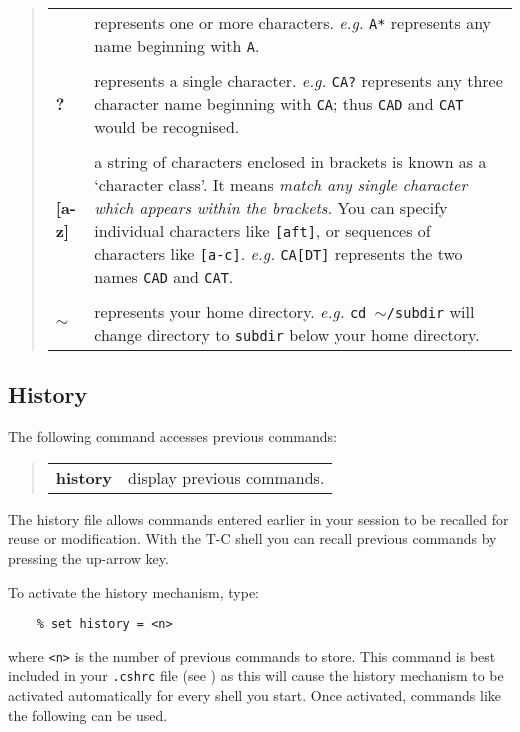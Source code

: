 \begin{quote}
\begin{tabular}{lp{77mm}}

{\bf  *}  & represents one or more characters. {\em e.g.}\/ {\tt A*}
  represents any name beginning with {\tt A}.\\
\\
{\bf  ?}  & represents a single character.  {\em e.g.}\/ {\tt CA?}
  represents any three character name beginning with {\tt CA}; thus {\tt CAD}
  and {\tt CAT} would be recognised.\\
\\
{\bf  [a-z]}   & a string of characters enclosed in brackets is known as a
  `character class'.  It means {\em match any single character which appears
  within the brackets.}  You can specify individual characters like
  {\tt [aft]}, or sequences of   characters like {\tt [a-c]}.  {\em e.g.}\/
  {\tt CA[DT]} represents the two names {\tt CAD} and {\tt CAT}.\\
\\
{\bf $\sim$}   & represents your home directory.  {\em e.g.}\/ {\tt cd
  {\bf $\sim$}/subdir} will change directory to {\tt subdir} below your home
  directory.

\end{tabular}
\end{quote}


\subsection{History}

The following command accesses previous commands:
\begin{quote}
\begin{tabular}{lp{67mm}}

{\bf history}  & display previous commands.

\end{tabular}
\end{quote}
The history file allows commands entered earlier in your session to be recalled
for reuse or modification.
With the T-C shell you can recall previous commands by pressing the
up-arrow key.

To activate the history mechanism, type:
\begin{verbatim}
    % set history = <n>
\end{verbatim}
where {\tt <n>} is the number of previous commands to store.
This command is best included in your {\tt .cshrc} file
(see )
as this will cause the history mechanism to be
activated automatically for every shell you start.
Once activated, commands like the following can be used.

